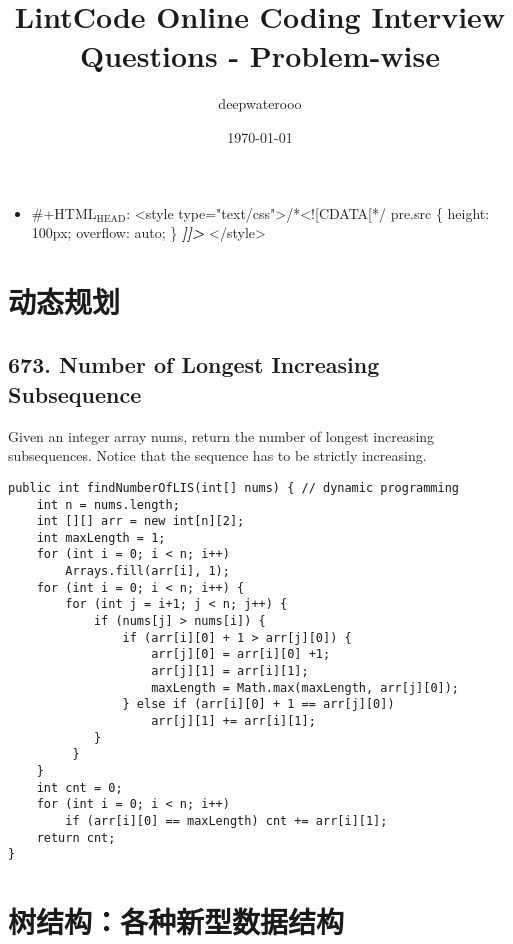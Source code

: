 \documentclass[9pt, b5paaper]{book}
\author{deepwaterooo}
\date{\today}
\title{LintCode Online Coding Interview Questions - Problem-wise}
\begin{document}
\maketitle
\tableofcontents

\begin{itemize}
\item \#+HTML$_{\text{HEAD}}$: <style type="text/css">/*<![CDATA[*/ pre.src \{ height: 100px; overflow: auto; \} \emph{\textbf{]]>}} </style>
\end{itemize}

\chapter{动态规划}
\label{sec-1}
\section{673. Number of Longest Increasing Subsequence}
\label{sec-1-1}
Given an integer array nums, return the number of longest increasing subsequences.
Notice that the sequence has to be strictly increasing.
\begin{verbatim}
public int findNumberOfLIS(int[] nums) { // dynamic programming
    int n = nums.length;
    int [][] arr = new int[n][2];
    int maxLength = 1;
    for (int i = 0; i < n; i++) 
        Arrays.fill(arr[i], 1);
    for (int i = 0; i < n; i++) {
        for (int j = i+1; j < n; j++) {
            if (nums[j] > nums[i]) {
                if (arr[i][0] + 1 > arr[j][0]) {
                    arr[j][0] = arr[i][0] +1;
                    arr[j][1] = arr[i][1];
                    maxLength = Math.max(maxLength, arr[j][0]);
                } else if (arr[i][0] + 1 == arr[j][0])
                    arr[j][1] += arr[i][1];
            }
         }
    }
    int cnt = 0;
    for (int i = 0; i < n; i++) 
        if (arr[i][0] == maxLength) cnt += arr[i][1];
    return cnt;
}
\end{verbatim}

\chapter{树结构：各种新型数据结构}
\label{sec-2}
\end{document}
